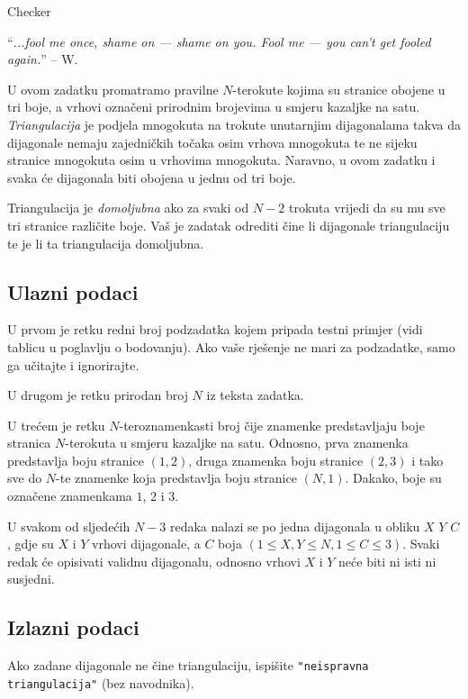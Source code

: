 \begin{statement}[
  problempoints=110,
  timelimit=3 sekunde,
  memorylimit=512 MiB,
]{Checker}

``\textit{...fool me once, shame on — shame on you. Fool me — you can't get fooled again.}''
-- W.

U ovom zadatku promatramo pravilne $N$-terokute kojima su stranice obojene u
tri boje, a vrhovi označeni prirodnim brojevima u smjeru kazaljke na satu.
\textit{Triangulacija} je podjela mnogokuta na trokute unutarnjim
dijagonalama takva da dijagonale nemaju zajedničkih točaka osim vrhova
mnogokuta te ne sijeku stranice mnogokuta osim u vrhovima mnogokuta.
Naravno, u ovom zadatku i svaka će dijagonala biti obojena u jednu od tri
boje.

Triangulacija je \textit{domoljubna} ako za svaki od $N-2$ trokuta vrijedi da
su mu sve tri stranice različite boje. Vaš je zadatak odrediti čine li
dijagonale triangulaciju te je li ta triangulacija domoljubna.

\subsection*{Ulazni podaci}
U prvom je retku redni broj podzadatka kojem pripada testni primjer
(vidi tablicu u poglavlju o bodovanju). Ako vaše rješenje ne mari za podzadatke,
samo ga učitajte i ignorirajte.

U drugom je retku prirodan broj $N$ iz teksta zadatka.

U trećem je retku $N$-teroznamenkasti broj čije znamenke predstavljaju boje
stranica $N$-terokuta u smjeru kazaljke na satu. Odnosno, prva znamenka
predstavlja boju stranice $(1,2)$, druga znamenka boju stranice $(2,3)$ i tako
sve do $N$-te znamenke koja predstavlja boju stranice $(N, 1)$. Dakako, boje su
označene znamenkama $1$, $2$ i $3$.

U svakom od sljedećih $N-3$ redaka nalazi se po jedna dijagonala u obliku
$X$ $Y$ $C$, gdje su $X$ i $Y$ vrhovi dijagonale, a $C$ boja
$(1 \le X, Y \le N, 1 \le C \le 3)$. Svaki redak će opisivati validnu
dijagonalu, odnosno vrhovi $X$ i $Y$ neće biti ni isti ni susjedni.

\subsection*{Izlazni podaci}
Ako zadane dijagonale ne čine triangulaciju, ispišite
\texttt{"neispravna triangulacija"} (bez navodnika).


\end{statement}
